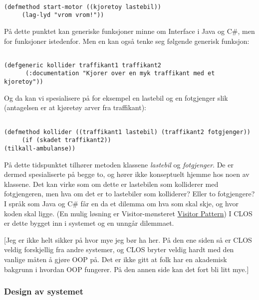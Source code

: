 \documentclass[11pt]{article}
\begin{document}
\begin{lstlisting}

(defmethod start-motor ((kjoretoy lastebil))
     (lag-lyd "vrom vrom!"))
\end{lstlisting}




På dette punktet kan generiske funksjoner minne om Interface i Java og C\#, men for funksjoner istedenfor. Men en kan også tenke seg følgende generisk funksjon:




\begin{lstlisting}

(defgeneric kollider traffikant1 traffikant2
      (:documentation "Kjorer over en myk traffikant med et kjoretoy"))
\end{lstlisting}




Og da kan vi spesialisere på for eksempel en lastebil og en fotgjenger slik (antagelsen er at kjøretøy arver fra traffikant):




\begin{lstlisting}

(defmethod kollider ((traffikant1 lastebil) (traffikant2 fotgjenger))
     (if (skadet traffikant2))
(tilkall-ambulanse))
\end{lstlisting}




På dette tidspunktet tilhører metoden klassene \emph{lastebil} og \emph{fotgjenger}. De er dermed spesialiserte på begge to, og hører ikke konseptuelt hjemme hos noen av klassene. Det kan virke som om dette er lastebilen som kolliderer med fotgjengeren, men hva om det er to lastebiler som kolliderer? Eller to fotgjengere? I språk som Java og C\# får en da et dilemma om hva som skal skje, og hvor koden skal ligge. (En mulig løsning er Visitor-mønsteret \href{(http://en.wikipedia.org/wiki/Visitor(UNDERLINE pattern}{Visitor Pattern}) I CLOS er dette bygget inn i systemet og en unngår dilemmaet.



[Jeg er ikke helt sikker på hvor mye jeg bør ha her. På den ene siden så er CLOS veldig forskjellig fra andre systemer, og CLOS bryter veldig hardt med den vanlige måten å gjøre OOP på. Det er ikke gitt at folk har en akademisk bakgrunn i hvordan OOP fungerer. På den annen side kan det fort bli litt mye.]



\subsubsection{Design av systemet}
\end{document}
